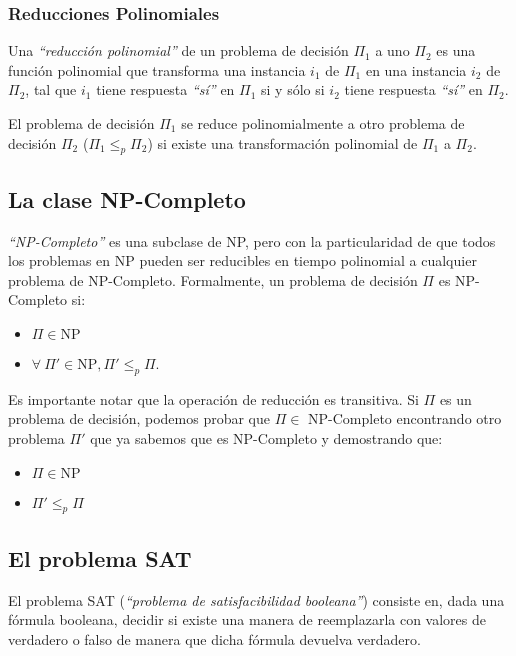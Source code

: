 \subsubsection{Reducciones Polinomiales}

Una \emph{``reducci\'on polinomial''} de un problema de decisi\'on $\Pi_1$ a uno $\Pi_2$ es una funci\'on polinomial que transforma una instancia  $i_1$ de $\Pi_1$ en una instancia $i_2$ de $\Pi_2$, tal que $i_1$ tiene respuesta \emph{``s\'i''} en $\Pi_1$ si y s\'olo si $i_2$ tiene respuesta \emph{``s\'i''} en $\Pi_2$.

El problema de decisi\'on $\Pi_1$ se reduce polinomialmente a otro problema de decisi\'on $\Pi_2$ ($\Pi_1 \leq_p \Pi_2$) si existe una transformaci\'on polinomial de $\Pi_1$ a $\Pi_2$.

\subsection{La clase NP-Completo}

\emph{``NP-Completo''} es una subclase de NP, pero con la particularidad de que todos los problemas en NP pueden ser reducibles en tiempo polinomial a cualquier problema de NP-Completo. Formalmente, un problema de decisi\'on $\Pi$ es NP-Completo si:

\begin{itemize}
\item $\Pi \in \textrm{NP}$
\item $\forall\ \Pi' \in \textrm{NP}, \Pi' \leq_p \Pi$.
\end{itemize} 

Es importante notar que la operaci\'on de reducci\'on es transitiva. Si $\Pi$ es un problema de decisi\'on, podemos probar que $\Pi \in$ NP-Completo encontrando otro problema $\Pi'$ que ya sabemos que es NP-Completo y demostrando que:

\begin{itemize}
\item $\Pi \in \textrm{NP}$
\item $\Pi' \leq_p \Pi$
\end{itemize} 

\subsection{El problema SAT}

El problema SAT (\emph{``problema de satisfacibilidad booleana''}) consiste en, dada una f\'ormula booleana, decidir si existe una manera de reemplazarla con valores de verdadero o falso de manera que dicha f\'ormula devuelva verdadero.


